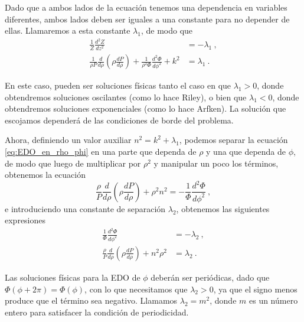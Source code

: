 Dado que a ambos lados de la ecuación tenemos una dependencia en variables diferentes, ambos lados deben ser iguales a una constante para no depender de ellas. Llamaremos a esta constante $\lambda_1$, de modo que
\begin{align}
    \frac{1}{Z} \frac{d^2Z}{dz^2} & = - \lambda_1 \ , \\
    \frac{1}{\rho P} \frac{d}{d\rho} \left( \rho \frac{dP}{d\rho} \right) + \frac{1}{\rho^2 \Phi} \frac{d^2 \Phi}{d\phi^2} + k^2 & = \lambda_1 \ . \label{eq:EDO_en_rho_phi}
\end{align}

En este caso, pueden ser soluciones físicas tanto el caso en que $\lambda_1>0$, donde obtendremos soluciones oscilantes (como lo hace Riley), o bien que $\lambda_1 < 0$, donde obtendremos soluciones exponenciales (como lo hace Arfken). La solución que escojamos dependerá de las condiciones de borde del problema.


Ahora, definiendo un valor auxiliar $n^2 = k^2 + \lambda_1$, podemos separar la ecuación \eqref{eq:EDO_en_rho_phi} en una parte que dependa de $\rho$ y una que dependa de $\phi$, de modo que luego de multiplicar por $\rho^2$ y manipular un poco los términos, obtenemos la ecuación
\begin{equation}
    \frac{\rho}{P} \frac{d}{d\rho} \left( \rho \frac{dP}{d\rho} \right) + \rho^2 n^2 = - \frac{1}{\Phi} \frac{d^2 \Phi}{d\phi^2} \ , 
\end{equation}
e introduciendo una constante de separación $\lambda_2$, obtenemos las siguientes expresiones
\begin{align}
    \frac{1}{\Phi} \frac{d^2 \Phi}{d\phi^2} & = - \lambda_2 \ , \\
    \frac{\rho}{P} \frac{d}{d\rho} \left( \rho \frac{dP}{d\rho} \right) + n^2 \rho^2 & = \lambda_2 \ .
\end{align}

Las soluciones físicas para la EDO de $\phi$ deberán ser periódicas, dado que $\Phi(\phi + 2\pi) = \Phi(\phi)$, con lo que necesitamos que $\lambda_2 > 0$, ya que el signo menos produce que el término sea negativo. Llamamos $\lambda_2 = m^2$, donde $m$ es un número entero para satisfacer la condición de periodicidad.

